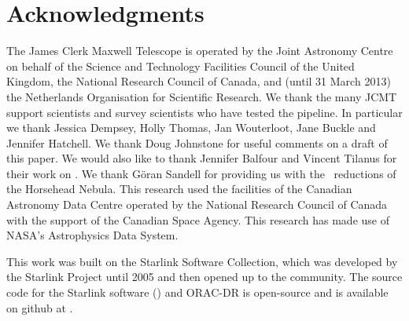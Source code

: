 \documentclass[final,authoryear,5p,times,twocolumn]{elsarticle}
\begin{document}
\section{Acknowledgments}

The James Clerk Maxwell Telescope is operated by the Joint Astronomy
Centre on behalf of the Science and Technology Facilities Council of
the United Kingdom, the National Research Council of Canada, and
(until 31 March 2013) the Netherlands Organisation for Scientific
Research. We thank the many JCMT support scientists and survey
scientists who have tested the pipeline. In particular we thank
Jessica Dempsey, Holly Thomas, Jan Wouterloot, Jane Buckle and
Jennifer Hatchell. We thank Doug Johnstone for useful comments on a
draft of this paper. We would also like to thank Jennifer Balfour and
Vincent Tilanus for their work on \gsdacsis. We thank
G\"{o}ran Sandell for providing us with the \specx\ reductions of the Horsehead
Nebula. This research used the facilities of the Canadian Astronomy
Data Centre operated by the National Research Council of Canada with
the support of the Canadian Space Agency. This research has made use
of NASA's Astrophysics Data System.

This work was built on the Starlink Software Collection, which was
developed by the Starlink Project until 2005
\citep{1982QJRAS..23..485D,2005ASPC..347...22D,2008ASPC..394..650C}
and then opened up to the community. The source code for the Starlink
software () and ORAC-DR is open-source and is
available on github at
.


\end{document}
